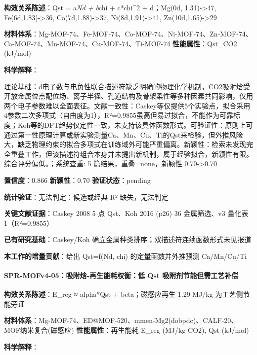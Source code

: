 \documentclass[12pt,a4paper]{ctexart}
\begin{document}
\textbf{构效关系陈述}：Qst = a\emph{Nd + b}chi + c*chi\^{}2 + d；Mg(0d, 1.31)-\textgreater47, Fe(6d,1.83)-\textgreater36, Co(7d,1.88)-\textgreater37, Ni(8d,1.91)-\textgreater41, Zn(10d,1.65)-\textgreater29

\textbf{材料体系}：Mg-MOF-74、Fe-MOF-74、Co-MOF-74、Ni-MOF-74、Zn-MOF-74、Ca-MOF-74、Mn-MOF-74、Cu-MOF-74、Ti-MOF-74 \textbar{} \textbf{性能属性}：Qst\_CO2 (kJ/mol)

\textbf{科学解释}：

理论基础：d电子数与电负性联合描述符缺乏明确的物理化学机制，CO2吸附焓受开放金属位点配位场、离子半径、孔道结构及骨架柔性等多种因素共同影响，仅用两个电子参数难以全面表征。文献一致性：Caskey等仅提供5个实验点，拟合采用4参数二次多项式（自由度为1），R²=0.9855虽高但易过拟合，不能作为可靠标度；Koh等的DFT趋势仅定性一致，未支持该具体函数形式。可验证性：原则上可通过第一性原理计算或新实验测量Ca、Mn、Cu、Ti的Qst来检验，但外推风险大，缺乏物理约束的拟合多项式在训练域外可能严重偏离。新颖性：检索未发现完全重叠工作，但该描述符组合本身并未提出新机制，属于经验拟合，新颖性有限。综合评分偏低。；系统查重: 5 篇结果，重叠=none，新颖性 0.70-\textgreater0.70

\textbf{置信度}：0.866 \textbar{} \textbf{新颖性}：0.70 \textbar{} \textbf{验证状态}：pending

\textbf{统计验证}：无法判定：候选或经典 R² 缺失，无法判定

\textbf{关键文献证据}：Caskey 2008 5 点 Qst、Koh 2016 (p26) 36 金属筛选、v3 量化表 1（R²=0.9855）

\textbf{已有研究基础}：Caskey/Koh 确立金属种类排序；双描述符连续函数形式未见报道

\textbf{本工作的增量贡献}：给出 Qst=f(Nd, chi) 的定量函数并外推预测 Ca/Mn/Cu/Ti

\paragraph{SPR-MOFv4-05：吸附焓-再生能耗权衡：低 Qst 吸附剂节能但需工艺补偿}\label{spr-mofv4-05ux5438ux9644ux7113-ux518dux751fux80fdux8017ux6743ux8861ux4f4e-qst-ux5438ux9644ux5242ux8282ux80fdux4f46ux9700ux5de5ux827aux8865ux507f}

\textbf{构效关系陈述}：E\_reg ≈ alpha*Qst + beta；磁感应再生 1.29 MJ/kg 为工艺侧节能旁证

\textbf{材料体系}：Mg-MOF-74、ED@MOF-520、mmen-Mg2(dobpdc)、CALF-20、MOF纳米复合(磁感应) \textbar{} \textbf{性能属性}：再生能耗 E\_reg (MJ/kg CO2), Qst (kJ/mol)

\textbf{科学解释}：
\end{document}
